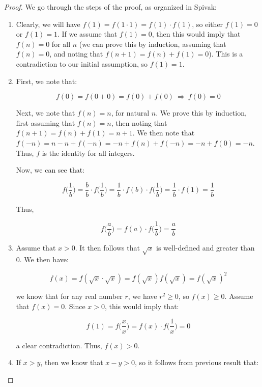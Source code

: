 \documentclass[10pt, oneside]{article}
\begin{document}
    \begin{proof}
      We go through the steps of the proof, as organized in Spivak:

      \begin{enumerate}
      \item Clearly, we will have $f(1) = f(1 \cdot 1) = f(1) \cdot f(1)$, so either $f(1) = 0$ or $f(1) = 1$. If we assume that $f(1) = 0$,
        then this would imply that $f(n) = 0$ for all $n$ (we can prove this by induction, assuming that $f(n) = 0$, and noting that $f(n + 1) = f(n) + f(1) = 0$).
        This is a contradiction to our initial assumption, so $f(1) = 1$.

      \item First, we note that:

        $$f(0) = f(0 + 0) = f(0) + f(0) \ \Rightarrow \ f(0) = 0$$

        Next, we note that $f(n) = n$, for natural $n$. We prove this by induction, first assuming that $f(n) = n$, then noting that $f(n + 1) = f(n) + f(1) = n + 1$.
        We then note that $f(-n) = n - n + f(-n) = -n + f(n) + f(-n) = -n + f(0) = -n$. Thus, $f$ is the identity for all integers.

        Now, we can see that:

        $$f\Big(\frac{1}{b}\Big) = \frac{b}{b} \cdot f\Big(\frac{1}{b}\Big) = \frac{1}{b} \cdot f(b) \cdot f\Big(\frac{1}{b}\Big) = \frac{1}{b} \cdot f(1) = \frac{1}{b}$$

        Thus,

        $$f\Big(\frac{a}{b}\Big) = f(a) \cdot f\Big( \frac{1}{b} \Big) = \frac{a}{b}$$

      \item Assume that $x > 0$. It then follows that $\sqrt{x}$ is well-defined and greater than $0$. We then have:

        $$f(x) = f(\sqrt{x} \cdot \sqrt{x}) = f(\sqrt{x}) f(\sqrt{x}) = f(\sqrt{x})^2$$

        we know that for any real number $r$, we have $r^2 \geq 0$, so $f(x) \geq 0$. Assume that $f(x) = 0$.
        Since $x > 0$, this would imply that:

        $$f(1) = f\Big( \frac{x}{x} \Big) = f(x) \cdot f\Big( \frac{1}{x} \Big) = 0$$

        a clear contradiction. Thus, $f(x) > 0$.

      \item If $x > y$, then we know that $x - y > 0$, so it follows from previous result that:


\end{enumerate}
\end{proof}
\end{document}
